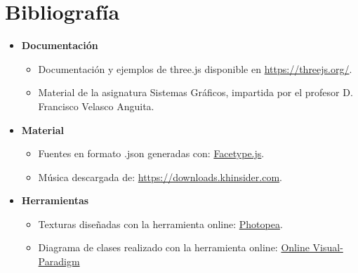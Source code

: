 \documentclass[11pt,a4paper]{article}
\begin{document}
\section{Bibliografía}

\begin{itemize}
    \item \textbf{Documentación} 
    \begin{itemize}
        \item Documentación y ejemplos de three.js disponible en \href{https://threejs.org/}{https://threejs.org/}.
        \item Material de la asignatura Sistemas Gráficos, impartida por el profesor D. Francisco Velasco Anguita.
    \end{itemize}
    \item \textbf{Material}
    \begin{itemize}
        \item Fuentes en formato .json generadas con: \href{http://gero3.github.io/facetype.js/}{Facetype.js}.
        \item Música descargada de: \href{https://downloads.khinsider.com/game-soundtracks/album/tetris-99-original-soundtrack}{https://downloads.khinsider.com}.
    \end{itemize}
    \item\textbf{Herramientas}
        \begin{itemize}
            
            \item Texturas diseñadas con la herramienta online: \href{https://www.photopea.com/}{Photopea}.
            \item Diagrama de clases realizado con la herramienta online: \href{https://online.visual-paradigm.com/es/}{Online Visual-Paradigm}
        \end{itemize}
    
\end{itemize}
\end{document}
